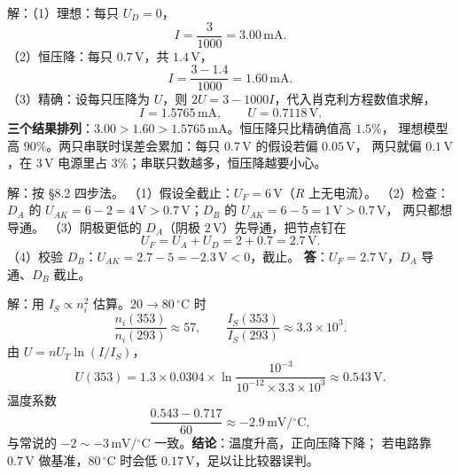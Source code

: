 \documentclass[11pt]{ctexart}
\begin{document}


解：（1）理想：每只 $U_D=0$，
\[
I=\frac{3}{1000}=3.00\,\mathrm{mA}.
\]
（2）恒压降：每只 $0.7\,\mathrm{V}$，共 $1.4\,\mathrm{V}$，
\[
I=\frac{3-1.4}{1000}=1.60\,\mathrm{mA}.
\]
（3）精确：设每只压降为 $U$，则 $2U=3-1000I$，代入肖克利方程数值求解，
\[
I=1.5765\,\mathrm{mA},\qquad U=0.7118\,\mathrm{V}.
\]
\textbf{三个结果排列}：$3.00>1.60>1.5765\,\mathrm{mA}$。恒压降只比精确值高 $1.5\%$，
理想模型高 $90\%$。两只串联时误差会累加：每只 $0.7\,\mathrm{V}$ 的假设若偏 $0.05\,\mathrm{V}$，
两只就偏 $0.1\,\mathrm{V}$，在 $3\,\mathrm{V}$ 电源里占 $3\%$；串联只数越多，恒压降越要小心。



解：按 §8.2 四步法。
（1）假设全截止：$U_F=6\,\mathrm{V}$（$R$ 上无电流）。
（2）检查：$D_A$ 的 $U_{AK}=6-2=4\,\mathrm{V}>0.7\,\mathrm{V}$；$D_B$ 的 $U_{AK}=6-5=1\,\mathrm{V}>0.7\,\mathrm{V}$，
两只都想导通。
（3）阴极更低的 $D_A$（阴极 $2\,\mathrm{V}$）先导通，把节点钉在
\[
U_F=U_A+U_D=2+0.7=2.7\,\mathrm{V}.
\]
（4）校验 $D_B$：$U_{AK}=2.7-5=-2.3\,\mathrm{V}<0$，截止。
\textbf{答}：$U_F=2.7\,\mathrm{V}$，$D_A$ 导通、$D_B$ 截止。



解：用 $I_S\propto n_i^2$ 估算。$20\to80\,{}^\circ\mathrm{C}$ 时
\[
\frac{n_i(353)}{n_i(293)}\approx57,\qquad
\frac{I_S(353)}{I_S(293)}\approx3.3\times10^{3}.
\]
由 $U=nU_T\ln(I/I_S)$，
\[
U(353)=1.3\times0.0304\times\ln\frac{10^{-3}}{10^{-12}\times3.3\times10^{3}}
\approx0.543\,\mathrm{V}.
\]
温度系数
\[
\frac{0.543-0.717}{60}\approx-2.9\,\mathrm{mV}/{}^\circ\mathrm{C},
\]
与常说的 $-2\sim-3\,\mathrm{mV}/{}^\circ\mathrm{C}$ 一致。\textbf{结论}：温度升高，正向压降下降；
若电路靠 $0.7\,\mathrm{V}$ 做基准，$80\,{}^\circ\mathrm{C}$ 时会低 $0.17\,\mathrm{V}$，足以让比较器误判。
\end{document}
